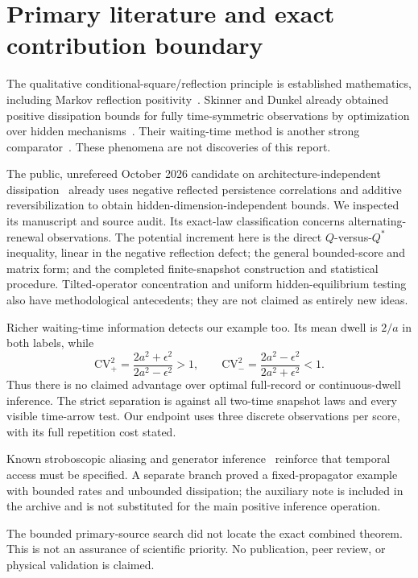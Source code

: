 \documentclass[11pt,a4paper]{article}
\begin{document}
\section{Primary literature and exact contribution boundary}
The qualitative conditional-square/reflection principle is established mathematics, including Markov reflection positivity~\cite{reflection}. Skinner and Dunkel already obtained positive dissipation bounds for fully time-symmetric observations by optimization over hidden mechanisms~\cite{sd_pnas}. Their waiting-time method is another strong comparator~\cite{sd_prl}. These phenomena are not discoveries of this report.

The public, unrefereed October 2026 candidate on architecture-independent dissipation~\cite{floor} already uses negative reflected persistence correlations and additive reversibilization to obtain hidden-dimension-independent bounds. We inspected its manuscript and source audit. Its exact-law classification concerns alternating-renewal observations. The potential increment here is the direct $Q$-versus-$Q^*$ inequality, linear in the negative reflection defect; the general bounded-score and matrix form; and the completed finite-snapshot construction and statistical procedure. Tilted-operator concentration and uniform hidden-equilibrium testing also have methodological antecedents; they are not claimed as entirely new ideas.

Richer waiting-time information detects our example too. Its mean dwell is $2/a$ in both labels, while
\[
\mathrm{CV}_+^2=\frac{2a^2+\epsilon^2}{2a^2-\epsilon^2}>1,
\qquad
\mathrm{CV}_-^2=\frac{2a^2-\epsilon^2}{2a^2+\epsilon^2}<1.
\]
Thus there is no claimed advantage over optimal full-record or continuous-dwell inference. The strict separation is against all two-time snapshot laws and every visible time-arrow test. Our endpoint uses three discrete observations per score, with its full repetition cost stated.

Known stroboscopic aliasing and generator inference~\cite{bauer} reinforce that temporal access must be specified. A separate branch proved a fixed-propagator example with bounded rates and unbounded dissipation; the auxiliary note is included in the archive and is not substituted for the main positive inference operation.

The bounded primary-source search did not locate the exact combined theorem. This is not an assurance of scientific priority. No publication, peer review, or physical validation is claimed.
\end{document}
